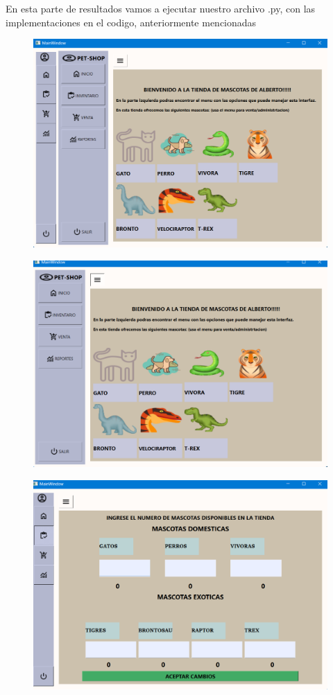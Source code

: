 \documentclass[11pt]{article}
\begin{document}
En esta parte de resultados vamos a ejecutar nuestro archivo .py, con las implementaciones en el codigo, anteriormente mencionadas

\begin{figure}[H]
		\begin{center}
 			\includegraphics[width = .6\textwidth]{13.png}
 			
		\end{center} 
\end{figure}

\begin{figure}[H]
		\begin{center}
 			\includegraphics[width = .6\textwidth]{14.png}
 			
		\end{center} 
\end{figure}

\begin{figure}[H]
		\begin{center}
 			\includegraphics[width = .6\textwidth]{15.png}
 			
		\end{center} 
\end{figure}
\end{document}
